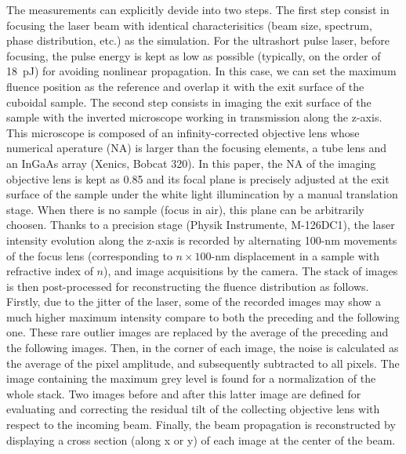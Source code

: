 \documentclass[9pt,twocolumn,twoside]{osajnl}
\begin{document}
The measurements can explicitly devide into two steps. The first step consist in focusing the laser beam with identical characterisitics (beam size, spectrum, phase distribution, etc.) as the simulation. For the ultrashort pulse laser, before focusing, the pulse energy is kept as low as possible (typically, on the order of 18~pJ) for avoiding nonlinear propagation. In this case, we can set the maximum fluence position as the reference and overlap it with the exit surface of the cuboidal sample. The second step consists in imaging the exit surface of the sample with the inverted microscope working in transmission along the z-axis. This microscope is composed of an infinity-corrected objective lens whose numerical aperature (NA) is larger than the focusing elements, a tube lens and an InGaAs array (Xenics, Bobcat 320). In this paper, the NA of the imaging objective lens is kept as 0.85 and its focal plane is precisely adjusted at the exit surface of the sample under the white light illumincation by a manual translation stage. When there is no sample (focus in air), this plane can be arbitrarily choosen. Thanks to a precision stage (Physik Instrumente, M-126DC1), the laser intensity evolution along the z-axis is recorded by alternating 100-nm movements of the focus lens (corresponding to $n\times100$-nm displacement in a sample with refractive index of $n$), and image acquisitions by the camera. The stack of images is then post-processed for reconstructing the fluence distribution as follows. Firstly, due to the jitter of the laser, some of the recorded images may show a much higher maximum intensity compare to both the preceding and the following one. These rare outlier images are replaced by the average of the preceding and the following images. Then, in the corner of each image, the noise is calculated as the average of the pixel amplitude, and subsequently subtracted to all pixels. The image containing the maximum grey level is found for a normalization of the whole stack. Two images before and after this latter image are defined for evaluating and correcting the residual tilt of the collecting objective lens with respect to the incoming beam. Finally, the beam propagation is reconstructed by displaying a cross section (along x or y) of each image at the center of the beam. 
\end{document}
